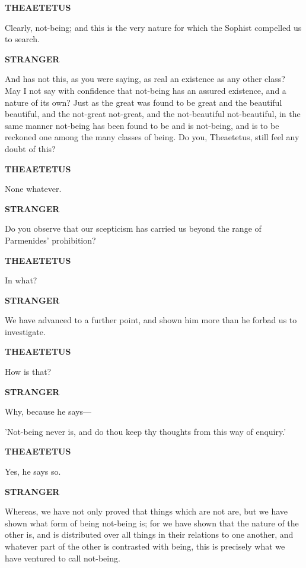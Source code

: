 \documentclass[11pt,letter]{article}
\begin{document}
\par \textbf{THEAETETUS}
\par   Clearly, not-being; and this is the very nature for which the Sophist compelled us to search.

\par \textbf{STRANGER}
\par   And has not this, as you were saying, as real an existence as any other class? May I not say with confidence that not-being has an assured existence, and a nature of its own? Just as the great was found to be great and the beautiful beautiful, and the not-great not-great, and the not-beautiful not-beautiful, in the same manner not-being has been found to be and is not-being, and is to be reckoned one among the many classes of being. Do you, Theaetetus, still feel any doubt of this?

\par \textbf{THEAETETUS}
\par   None whatever.

\par \textbf{STRANGER}
\par   Do you observe that our scepticism has carried us beyond the range of Parmenides' prohibition?

\par \textbf{THEAETETUS}
\par   In what?

\par \textbf{STRANGER}
\par   We have advanced to a further point, and shown him more than he forbad us to investigate.

\par \textbf{THEAETETUS}
\par   How is that?

\par \textbf{STRANGER}
\par   Why, because he says—

\par  'Not-being never is, and do thou keep thy thoughts from this way of enquiry.'

\par \textbf{THEAETETUS}
\par   Yes, he says so.

\par \textbf{STRANGER}
\par   Whereas, we have not only proved that things which are not are, but we have shown what form of being not-being is; for we have shown that the nature of the other is, and is distributed over all things in their relations to one another, and whatever part of the other is contrasted with being, this is precisely what we have ventured to call not-being.
\end{document}
